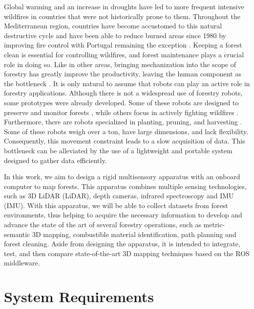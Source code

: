 Global warming and an increase in droughts have led to more frequent intensive wildfires in countries that were not historically prone to them. Throughout the Mediterranean region, countries have become accustomed to this natural destructive cycle and have been able to reduce burned areas since 1980 by improving fire control with Portugal remaining the exception \cite{turco_decreasing_2016, european_commission_joint_research_centre_forest_2021}. Keeping a forest clean is essential for controlling wildfires, and forest maintenance plays a crucial role in doing so. Like in other areas, bringing mechanization into the scope of forestry has greatly improve the productivity, leaving the human component as the bottleneck \cite{parker_robotics_2016}. It is only natural to assume that robots can play an active role in forestry applications. Although there is not a widespread use of forestry robots, some prototypes were already developed.  Some of these robots are designed to preserve and monitor forests \cite{couceiro_semfire_2019, jelavic_towards_2021, lam_flexible_2011, notomista_slothbot_2019}, while others focus in actively fighting wildfires \cite{noauthor_firefighting_2014, hose_cartridge, hydra}. Furthermore, there are robots specialized in planting, pruning, and harvesting \cite{noauthor_multiscope_nodate, molina_aerial_2017, zhang_rubber-tapping_2019}. Some of these robots weigh over a ton, have large dimensions, and lack flexibility. Consequently, this movement constraint leads to a slow acquisition of data. This bottleneck can be alleviated by the use of a lightweight and portable system designed to gather data efficiently.

In this work, we aim to design a rigid multisensory apparatus with an onboard computer to map forests. This apparatus combines multiple sensing technologies, such as 3D \acl{LiDAR} (\acs{LiDAR}), depth cameras, infrared spectroscopy and \acl{IMU} (\acs{IMU}). With this apparatus, we will be able to collect datasets from forest environments, thus helping to acquire the necessary information to develop and advance the state of the art of several forestry operations, such as metric-semantic 3D mapping, combustible material identification, path planning and forest cleaning. Aside from designing the apparatus, it is intended to integrate, test, and then compare state-of-the-art 3D mapping techniques based on the ROS middleware.

\section{System Requirements}

